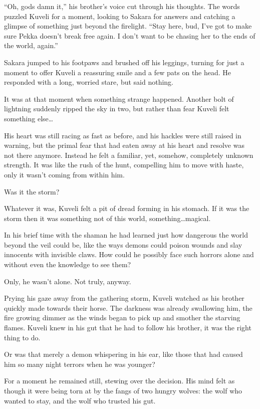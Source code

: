 ``Oh, gods damn it,'' his brother's voice cut through his thoughts. The words puzzled Kuveli for a moment, looking to Sakara for answers and catching a glimpse of something just beyond the firelight. ``Stay here, bud, I've got to make sure Pekka doesn't break free again. I don't want to be chasing her to the ends of the world, again.''

Sakara jumped to his footpaws and brushed off his leggings, turning for just a moment to offer Kuveli a reassuring smile and a few pats on the head. He responded with a long, worried stare, but said nothing.

It was at that moment when something strange happened. Another bolt of lightning suddenly ripped the sky in two, but rather than fear Kuveli felt something else\ldots{}

His heart was still racing as fast as before, and his hackles were still raised in warning, but the primal fear that had eaten away at his heart and resolve was not there anymore. Instead he felt a familiar, yet, somehow, completely unknown strength. It was like the rush of the hunt, compelling him to move with haste, only it wasn't coming from within him.

Was it the storm?

Whatever it was, Kuveli felt a pit of dread forming in his stomach. If it was the storm then it was something not of this world, something\ldots{}magical.

In his brief time with the shaman he had learned just how dangerous the world beyond the veil could be, like the ways demons could poison wounds and slay innocents with invisible claws. How could he possibly face such horrors alone and without even the knowledge to see them?

Only, he wasn't alone. Not truly, anyway.

Prying his gaze away from the gathering storm, Kuveli watched as his brother quickly made towards their horse. The darkness was already swallowing him, the fire growing dimmer as the winds began to pick up and smother the starving flames. Kuveli knew in his gut that he had to follow his brother, it was the right thing to do.

Or was that merely a demon whispering in his ear, like those that had caused him so many night terrors when he was younger?

For a moment he remained still, stewing over the decision. His mind felt as though it were being torn at by the fangs of two hungry wolves: the wolf who wanted to stay, and the wolf who trusted his gut.

